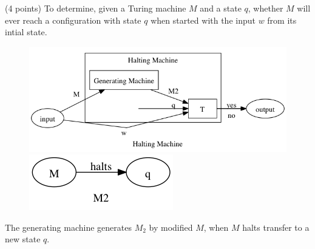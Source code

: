 \documentclass[paper=a4, fontsize=11pt]{scrartcl} %
\begin{document}
\maketitle %



\section{}
\begin{fancyquotes}
  (4 points) To determine, given a Turing machine $M$ and a state
  $q$, whether $M$ will ever reach a configuration with state $q$
  when started with the input $w$ from its intial state.
\end{fancyquotes}

\begin{figure}[H]
  \centering
  \includegraphics[width=\textwidth]{9-1.gv.png}
  \includegraphics[width=.5\textwidth]{9-1.gv.2.png}
\end{figure}

The generating machine generates $M_2$ by modified $M$, when $M$
halts transfer to a new state $q$.
\end{document}
